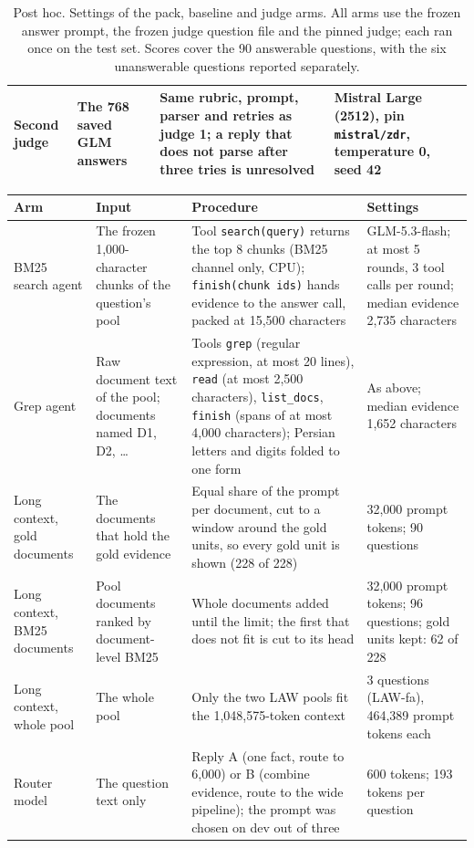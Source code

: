 \begin{table}[t]
\begin{tabularx}{\textwidth}{@{}p{2.6cm}p{2.9cm}Xp{2.8cm}@{}}
Second judge & The 768 saved GLM answers & Same rubric, prompt, parser and retries as judge 1; a reply that does not parse after three tries is unresolved & Mistral Large (2512), pin \texttt{mistral/zdr}, temperature 0, seed 42 \\
\bottomrule
\end{tabularx}
\caption{Post hoc. Settings of the pack, baseline and judge arms. All arms use the frozen answer prompt, the frozen judge question file and the pinned judge; each ran once on the test set. Scores cover the 90 answerable questions, with the six unanswerable questions reported separately.}
\label{tab:posthoc-settings}
\end{table}

\begin{table}[t]
\centering
\scriptsize
\setlength{\tabcolsep}{4pt}
\begin{tabularx}{\textwidth}{@{}p{2.6cm}p{2.9cm}Xp{2.8cm}@{}}
\toprule
Arm & Input & Procedure & Settings \\
\midrule
BM25 search agent & The frozen 1,000-character chunks of the question's pool & Tool \texttt{search(query)} returns the top 8 chunks (BM25 channel only, CPU); \texttt{finish(chunk ids)} hands evidence to the answer call, packed at 15,500 characters & GLM-5.3-flash; at most 5 rounds, 3 tool calls per round; median evidence 2,735 characters \\
Grep agent & Raw document text of the pool; documents named D1, D2, \ldots & Tools \texttt{grep} (regular expression, at most 20 lines), \texttt{read} (at most 2,500 characters), \texttt{list\_docs}, \texttt{finish} (spans of at most 4,000 characters); Persian letters and digits folded to one form & As above; median evidence 1,652 characters \\
Long context, gold documents & The documents that hold the gold evidence & Equal share of the prompt per document, cut to a window around the gold units, so every gold unit is shown (228 of 228) & 32,000 prompt tokens; 90 questions \\
Long context, BM25 documents & Pool documents ranked by document-level BM25 & Whole documents added until the limit; the first that does not fit is cut to its head & 32,000 prompt tokens; 96 questions; gold units kept: 62 of 228 \\
Long context, whole pool & The whole pool & Only the two LAW pools fit the 1,048,575-token context & 3 questions (LAW-fa), 464,389 prompt tokens each \\
Router model & The question text only & Reply A (one fact, route to \hybrid{} 6,000) or B (combine evidence, route to the wide pipeline); the prompt was chosen on dev out of three & 600 tokens; 193 tokens per question \\

\end{tabularx}
\end{table}
